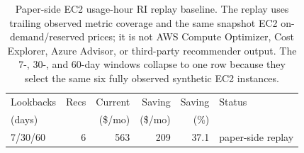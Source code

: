 \begin{table}[t]
\caption{Paper-side EC2 usage-hour RI replay baseline. The replay uses trailing observed metric coverage and the same snapshot EC2 on-demand/reserved prices; it is not AWS Compute Optimizer, Cost Explorer, Azure Advisor, or third-party recommender output. The 7-, 30-, and 60-day windows collapse to one row because they select the same six fully observed synthetic EC2 instances.}
\label{tab:commercial-like}
\centering
\renewcommand{\arraystretch}{1.06}
\begin{tabular}{@{}l r r r r l@{}}
\toprule
Lookbacks & Recs & Current & Saving & Saving & Status \\
(days) & & (\$/mo) & (\$/mo) & (\%) & \\
\midrule
7/30/60 & 6 & 563 & 209 & 37.1 & paper-side replay \\
\bottomrule
\end{tabular}
\end{table}
